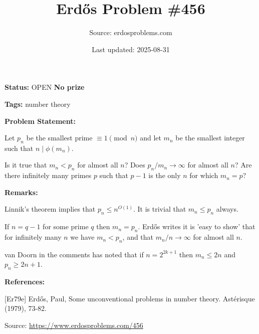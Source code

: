 \documentclass{article}
\title{Erd\H{o}s Problem \#456}
\date{Last updated: 2025-08-31}
\author{Source: erdosproblems.com}
\begin{document}
\maketitle

\noindent\textbf{Status:} OPEN \quad \textbf{No prize}

\noindent\textbf{Tags:} number theory

\medskip
\noindent\textbf{Problem Statement:}

Let $p_n$ be the smallest prime $\equiv 1\pmod{n}$ and let $m_n$ be the smallest integer such that $n\mid \phi(m_n)$.

Is it true that $m_n<p_n$ for almost all $n$? Does $p_n/m_n\to \infty$ for almost all $n$? Are there infinitely many primes $p$ such that $p-1$ is the only $n$ for which $m_n=p$?

\bigskip
\noindent\textbf{Remarks:}

Linnik's theorem implies that $p_n\leq n^{O(1)}$. It is trivial that $m_n\leq p_n$ always.

If $n=q-1$ for some prime $q$ then $m_n=p_n$. Erd\H{o}s \cite{Er79e} writes it is 'easy to show' that for infinitely many $n$ we have $m_n <p_n$, and that $m_n/n\to \infty$ for almost all $n$.

van Doorn in the comments has noted that if $n=2^{2k+1}$ then $m_n\leq 2n$ and $p_n\geq 2n+1$.

\bigskip
\noindent\textbf{References:}

[Er79e] Erd\H{o}s, Paul, Some unconventional problems in number theory. Ast\'{e}risque (1979), 73-82.

\bigskip
\noindent\small{Source: \url{https://www.erdosproblems.com/456}}
\end{document}
